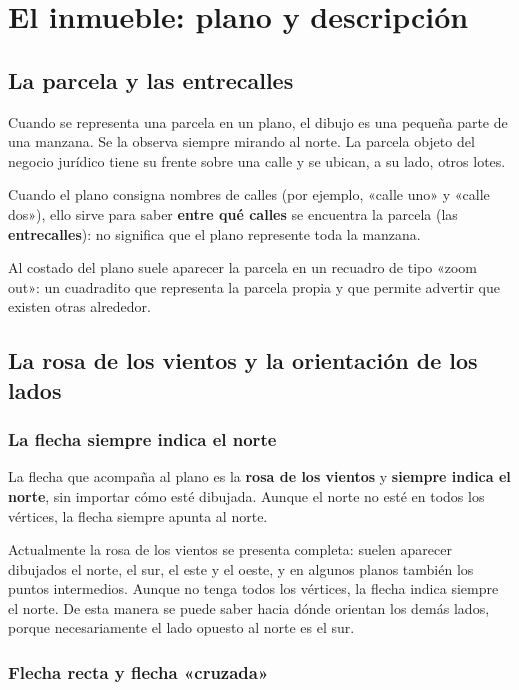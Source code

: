 \documentclass[12pt,oneside]{book}
\begin{document}
\chapter[El inmueble: plano y descripción]{El inmueble: plano y descripción}

\section{La parcela y las entrecalles}

Cuando se representa una parcela en un plano, el dibujo es una pequeña parte de una manzana. Se la observa siempre mirando al norte. La parcela objeto del negocio jurídico tiene su frente sobre una calle y se ubican, a su lado, otros lotes.

Cuando el plano consigna nombres de calles (por ejemplo, «calle uno» y «calle dos»), ello sirve para saber \textbf{entre qué calles} se encuentra la parcela (las \textbf{entrecalles}): no significa que el plano represente toda la manzana.

Al costado del plano suele aparecer la parcela en un recuadro de tipo «zoom out»: un cuadradito que representa la parcela propia y que permite advertir que existen otras alrededor.

\section{La rosa de los vientos y la orientación de los lados}

\subsection{La flecha siempre indica el norte}

La flecha que acompaña al plano es la \textbf{rosa de los vientos} y \textbf{siempre indica el norte}, sin importar cómo esté dibujada. Aunque el norte no esté en todos los vértices, la flecha siempre apunta al norte.

Actualmente la rosa de los vientos se presenta completa: suelen aparecer dibujados el norte, el sur, el este y el oeste, y en algunos planos también los puntos intermedios. Aunque no tenga todos los vértices, la flecha indica siempre el norte. De esta manera se puede saber hacia dónde orientan los demás lados, porque necesariamente el lado opuesto al norte es el sur.

\subsection{Flecha recta y flecha «cruzada»}
\end{document}
